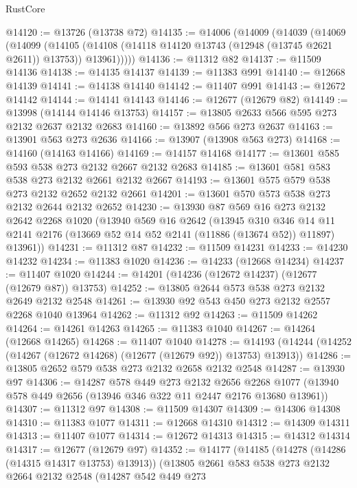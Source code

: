 \begin{lexlean}{RustCore}
\begin{coremodule}
@14120 := @13726 (@13738 @72)
@14135 := @14006
    (@14009
      (@14039
        (@14069
          (@14099
            (@14105 (@14108 (@14118 @14120 @13743 (@12948 (@13745 @2621 @2611)) @13753)) @13961)))))
@14136 := @11312 @82
@14137 := @11509 @14136
@14138 := @14135 @14137
@14139 := @11383 @991
@14140 := @12668 @14139
@14141 := @14138 @14140
@14142 := @11407 @991
@14143 := @12672 @14142
@14144 := @14141 @14143
@14146 := @12677 (@12679 @82)
@14149 := @13998 (@14144 @14146 @13753)
@14157 := @13805 @2633 @566 @595 @273 @2132 @2637 @2132 @2683
@14160 := @13892 @566 @273 @2637
@14163 := @13901 @563 @273 @2636
@14166 := @13907 (@13908 @563 @273)
@14168 := @14160 (@14163 @14166)
@14169 := @14157 @14168
@14177 := @13601 @585 @593 @538 @273 @2132 @2667 @2132 @2683
@14185 := @13601 @581 @583 @538 @273 @2132 @2661 @2132 @2667
@14193 := @13601 @575 @579 @538 @273 @2132 @2652 @2132 @2661
@14201 := @13601 @570 @573 @538 @273 @2132 @2644 @2132 @2652
@14230 := @13930
    @87
    @569
    @16
    @273
    @2132
    @2642
    @2268
    @1020
    (@13940
      @569
      @16
      @2642
      (@13945
        @310
        @346
        @14
        @11
        @2141
        @2176
        (@13669 @52 @14 @52 @2141 (@11886 (@13674 @52)) @11897)
        @13961))
@14231 := @11312 @87
@14232 := @11509 @14231
@14233 := @14230 @14232
@14234 := @11383 @1020
@14236 := @14233 (@12668 @14234)
@14237 := @11407 @1020
@14244 := @14201 (@14236 (@12672 @14237) (@12677 (@12679 @87)) @13753)
@14252 := @13805 @2644 @573 @538 @273 @2132 @2649 @2132 @2548
@14261 := @13930 @92 @543 @450 @273 @2132 @2557 @2268 @1040 @13964
@14262 := @11312 @92
@14263 := @11509 @14262
@14264 := @14261 @14263
@14265 := @11383 @1040
@14267 := @14264 (@12668 @14265)
@14268 := @11407 @1040
@14278 := @14193 (@14244 (@14252 (@14267 (@12672 @14268) (@12677 (@12679 @92)) @13753) @13913))
@14286 := @13805 @2652 @579 @538 @273 @2132 @2658 @2132 @2548
@14287 := @13930 @97
@14306 := @14287
    @578
    @449
    @273
    @2132
    @2656
    @2268
    @1077
    (@13940 @578 @449 @2656 (@13946 @346 @322 @11 @2447 @2176 @13680 @13961))
@14307 := @11312 @97
@14308 := @11509 @14307
@14309 := @14306 @14308
@14310 := @11383 @1077
@14311 := @12668 @14310
@14312 := @14309 @14311
@14313 := @11407 @1077
@14314 := @12672 @14313
@14315 := @14312 @14314
@14317 := @12677 (@12679 @97)
@14352 := @14177
    (@14185
      (@14278 (@14286 (@14315 @14317 @13753) @13913))
      (@13805
        @2661
        @583
        @538
        @273
        @2132
        @2664
        @2132
        @2548
        (@14287
          @542
          @449
          @273

\end{coremodule}
\end{lexlean}
